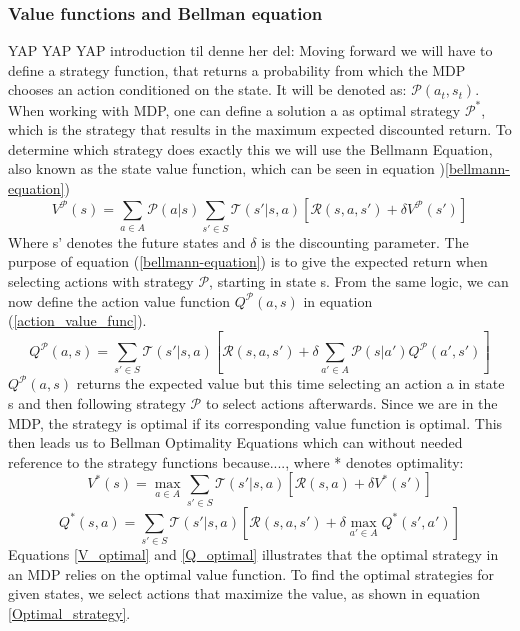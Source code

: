 \documentclass{article}
\begin{document}
\subsubsection{Value functions and Bellman equation}
YAP YAP YAP introduction til denne her del:
Moving forward we will have to define a strategy function, that returns a probability from which the MDP chooses an action conditioned on the state. It will be denoted as: $\mathcal{P}(a_t,s_t)$. When working with MDP, one can define a solution a as optimal strategy $\mathcal{P}^*$, which is the strategy that results in the maximum expected discounted return. 
To determine which strategy does exactly this we will use the Bellmann Equation, also known as the state value function, which can be seen in equation )\ref{bellmann-equation})
\begin{equation}
    \label{bellmann-equation}
    V^{\mathcal{P}}(s)= \sum_{a\in A}\mathcal{P}(a|s)\sum_{s'\in S}\mathcal{T}(s'|s,a)[\mathcal{R}(s,a,s')+\delta V^{\mathcal{P}}(s')]
\end{equation}
Where s' denotes the future states and $\delta$ is the discounting parameter. 
The purpose of equation (\ref{bellmann-equation}) is to give the expected return when selecting actions with strategy $\mathcal{P}$, starting in state s. From the same logic, we can now define the action value function $Q^{\mathcal{P}}(a,s)$ in equation (\ref{action_value_func}).
\begin{equation}
    \label{action_value_func}
    Q^{\mathcal{P}}(a,s)=\sum_{s'\in S}\mathcal{T}(s'|s,a)[\mathcal{R}(s,a,s')+\delta\sum_{a'\in A}\mathcal{P}(s|a')Q^{\mathcal{P}}(a',s')]
\end{equation}
$Q^{\mathcal{P}}(a,s)$ returns the expected value but this time selecting an action a in state s and then following strategy $\mathcal{P}$ to select actions afterwards.
Since we are in the MDP, the strategy is optimal if its corresponding value function is optimal. This then leads us to Bellman Optimality Equations which can without needed reference to the strategy functions because...., where * denotes optimality:
\begin{equation}
    \label{V_optimal}
    V^*(s) = \max_{a\in A}\sum_{s'\in S}\mathcal{T}(s'|s,a)[\mathcal{R}(s,a)+\delta V^*(s')]
\end{equation}
\begin{equation}
    \label{Q_optimal}
    Q^*(s,a)= \sum_{s'\in S}\mathcal{T}(s'|s,a)[\mathcal{R}(s,a,s')+\delta \max_{a'\in A}Q^*(s',a')]
\end{equation}
Equations \ref{V_optimal} and \ref{Q_optimal} illustrates that the optimal strategy in an MDP relies on the optimal value function. To find the optimal strategies for given states, we select actions that maximize the value, as shown in equation \ref{Optimal_strategy}.
\end{document}
